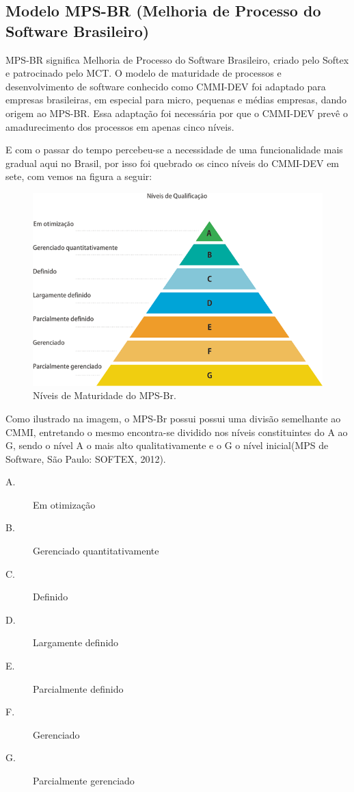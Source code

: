   \subsection{Modelo MPS-BR (Melhoria de Processo do Software Brasileiro)}
MPS-BR significa Melhoria de Processo do Software Brasileiro, criado pelo Softex e patrocinado pelo MCT. O modelo de maturidade de processos e desenvolvimento de software conhecido como CMMI-DEV foi adaptado para empresas brasileiras, em especial para micro, pequenas e médias empresas, dando origem ao MPS-BR. Essa adaptação foi necessária por que o CMMI-DEV prevê o amadurecimento dos processos em apenas cinco níveis.

E com o passar do tempo percebeu-se a necessidade de uma funcionalidade mais gradual aqui no Brasil, por isso foi quebrado os cinco níveis do CMMI-DEV em sete, com vemos na figura a seguir:
  \begin{figure}[!htbp]
    \centering
    \includegraphics[scale=0.5]{editaveis/figuras/650x432xniveis_de_qualificacao}
    \caption[Níveis de Maturidade do MPS-Br]{Níveis de Maturidade do MPS-Br. \footnotemark}
    \label{niveis-maturidade-mps-br}
  \end{figure}
  
Como ilustrado na imagem, o MPS-Br possui possui uma divisão semelhante ao CMMI, entretando o mesmo encontra-se dividido nos níveis constituintes do A ao G, sendo o nível A o mais alto qualitativamente e o G o nível inicial(MPS de Software, São Paulo: SOFTEX, 2012).	
\begin{description}
\item[A.] Em otimização
\item[B.] Gerenciado quantitativamente
\item[C.] Definido
\item[D.] Largamente definido
\item[E.] Parcialmente definido
\item[F.] Gerenciado
\item[G.] Parcialmente gerenciado	
\end{description}			

